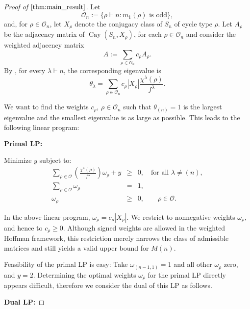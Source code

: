 \documentclass[12pt]{article}
\theoremstyle{definition}
\newcommand{\OO}{\mathcal O}
\newcommand{\1}{\mathbf 1}
\newcommand{\Cay}{\operatorname{Cay}}
\begin{document}
\begin{proof}[Proof of $\Cref{thm:main_result}$]
Let
$$
\mathcal{O}_n
:=
\{\rho\vdash n:m_1(\rho)\text{ is odd}\},
$$
and, for $\rho\in\mathcal{O}_n$, let $X_\rho$ denote the conjugacy class of
$S_n$ of cycle type $\rho$. 
Let $A_\rho$ be the adjacency matrix of $\Cay(S_n,X_\rho)$, for each $\rho\in \OO_n$ and consider the weighted adjacency matrix
$$
A
:=
\sum_{\rho\in\mathcal{O}_n}c_\rho A_\rho.
$$
By , for every
$\lambda\vdash n$, the corresponding eigenvalue is
$$
\theta_\lambda
=
\sum_{\rho\in\mathcal{O}_n}
c_\rho |X_\rho|\frac{\chi^\lambda(\rho)}{f^\lambda}.
$$

We want to find the weights $c_\rho$, $\rho\in \OO_n$ such that $\theta_{(n)}=1$ is the largest eigenvalue and the smallest eigenvalue is as large as possible. This leads to the following linear program:

\noindent\textbf{Primal LP:}

\noindent Minimize $y$ subject to:
\begin{eqnarray*}
    \sum_{\rho \in \OO} \left( \frac{\chi^{\lambda}(\rho) }{f^{\lambda}} \right) \omega_{\rho} + y &\ge& 0, \quad \text{for all } \lambda \neq (n),\\
    \sum_{\rho \in \OO} \omega_{\rho} &=& 1,\\
    \omega_\rho&\geq& 0, \qquad\rho\in\OO.
\end{eqnarray*}

In the above linear program, $\omega_\rho=c_\rho|X_\rho|$. We restrict to nonnegative weights $\omega_\rho$, and hence to $c_\rho\geq 0$. Although signed weights are allowed in the weighted Hoffman framework, this restriction merely narrows the class of admissible matrices and still yields a valid upper bound for $M(n)$.

Feasibility of the primal LP is easy: Take $\omega_{(n-1,1)}=1$ and all other $\omega_\rho$ zero, and $y=2$. Determining the optimal weights
$\omega_\rho$ for the primal LP directly appears difficult, therefore we consider the dual of this LP as follows.


\noindent\textbf{Dual LP:}


\end{proof}
\end{document}
